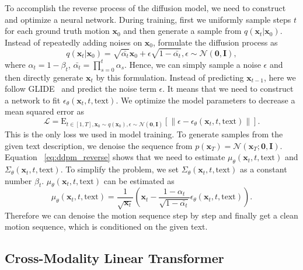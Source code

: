 To accomplish the reverse process of the diffusion model, we need to construct and optimize a neural network. During training, first we uniformly sample steps $t$ for each ground truth motion $\mathbf{x}_0$ and then generate a sample from 
$q(\mathbf{x}_t \vert \mathbf{x}_0)$. Instead of repeatedly adding noises on $\mathbf{x}_0$, \cite{ho2020denoising} formulate the diffusion process as
\begin{equation}
    q(\mathbf{x}_t \vert \mathbf{x}_0)= \sqrt{\bar{\alpha_t}}\mathbf{x}_0 + \epsilon \sqrt{1-\bar{\alpha_t}}, \epsilon \sim \mathcal{N}(\mathbf{0}, \mathbf{I}),
\end{equation}
where $\alpha_t=1-\beta_t$, $\bar{\alpha_t}=\prod_{s=0}^t \alpha_s$. Hence, we can simply sample a noise $\epsilon$ and then directly generate $\mathbf{x}_t$ by this formulation. Instead of predicting $\mathbf{x}_{t-1}$, here we follow GLIDE~\citep{nichol2021glide} and predict the noise term $\epsilon$. It means that we need to construct a network to fit $\epsilon_{\theta}(\mathbf{x}_t,t,\textrm{text})$. We optimize the model parameters to decrease a mean squared error as
\begin{equation}
    \mathcal{L}=\mathrm{E}_{t \in [1,T], \mathbf{x}_0 \sim q(\mathbf{x}_0),\epsilon \sim \mathcal{N}(\mathbf{0}, \mathbf{I})} [\parallel \epsilon - \epsilon_{\theta}(\mathbf{x}_t,t,\textrm{text}) \parallel].
\end{equation}
This is the only loss we used in model training. To generate samples from the given text description, we denoise the sequence from $p(\mathbf{x}_{T}) = \mathcal{N}(\mathbf{x}_{T};\mathbf{0}, \mathbf{I})$. Equation ~\ref{eq:ddpm_reverse} shows that we need to estimate $\mu_\theta(\mathbf{x}_{t}, t, \textrm{text})$ and $\Sigma_\theta(\mathbf{x}_{t}, t, \textrm{text})$. To simplify the problem, we set $\Sigma_\theta(\mathbf{x}_{t}, t, \textrm{text})$ as a constant number $\beta_t$. $\mu_\theta(\mathbf{x}_{t}, t, \textrm{text})$ can be estimated as
\begin{equation}
    \mu_\theta(\mathbf{x}_{t}, t, \textrm{text}) = \frac{1}{\sqrt{\mathbf{x}_t}}(\mathbf{x}_t-\frac{1-\alpha_t}{\sqrt{1-\bar{\alpha_t}}} \epsilon_{\theta}(\mathbf{x}_t,t,\textrm{text})).
\end{equation}
Therefore we can denoise the motion sequence step by step and finally get a clean motion sequence, which is conditioned on the given text.

\subsection{Cross-Modality Linear Transformer}\label{sec3_4}

